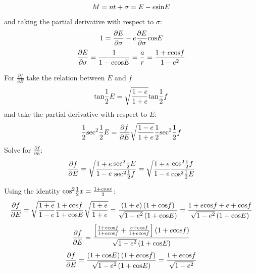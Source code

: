 \documentclass[]{aiaa-tc}%
\begin{document}
	\begin{equation}
		M=nt+\sigma=E-e\textup{sin}E 
	\end{equation}
and taking the partial derivative with respect to $\sigma$:
	\begin{equation}
		1=\frac{\partial E}{\partial \sigma}-e\frac{\partial E}{\partial \sigma}\textup{cos}E 
	\end{equation}
	\begin{equation}
		\frac{\partial E}{\partial \sigma}=\frac{1}{1-e\textup{cos}E}=\frac{a}{r}=\frac{1+e\textup{cos}f}{1-e^2}
		\label{eqn:partialESig}
	\end{equation}

For $\frac{\partial f}{\partial E}$ take the relation between $E$ and $f$ 
	\begin{equation}
		\textup{tan}\frac{1}{2}E=\sqrt{\frac{1-e}{1+e}}\textup{tan}\frac{1}{2}f
	\end{equation}
and take the partial derivative with respect to $E$:
	\begin{equation}
		\frac{1}{2}\textup{sec}^2\frac{1}{2}E=\frac{\partial f}{\partial E}\sqrt{\frac{1-e}{1+e}}\frac{1}{2}\textup{sec}^2\frac{1}{2}f
	\end{equation}
Solve for $\frac{\partial f}{\partial E}$:
	\begin{equation}
		\frac{\partial f}{\partial E} = \sqrt{\frac{1+e}{1-e}}\frac{\textup{sec}^2\frac{1}{2}E}{\textup{sec}^2\frac{1}{2}f}= \sqrt{\frac{1+e}{1-e}}\frac{\textup{cos}^2\frac{1}{2}f}{\textup{cos}^2\frac{1}{2}E}
	\end{equation}

Using the identity $\textup{cos}^2\frac{1}{2}x=\frac{1+{cos}x}{2}$:
	\begin{equation}
		\frac{\partial f}{\partial E} = \sqrt{\frac{1+e}{1-e}}\frac{1+\textup{cos}f}{1+\textup{cos}E}\sqrt{\frac{1+e}{1+e}}=\frac{\left ( 1+e \right )\left (1+\textup{cos}f  \right )}{\sqrt{1-e^2}\left (1+\textup{cos}E  \right )}=\frac{1+e\textup{cos}f+e+\textup{cos}f}{\sqrt{1-e^2}\left (1+\textup{cos}E  \right )}
	\end{equation}
	\begin{equation}
		\frac{\partial f}{\partial E} =\frac{ \left [\frac{1+e\textup{cos}f}{1+e\textup{cos}f}+\frac{e+\textup{cos}f }{1+e\textup{cos}f}  \right ]\left (1+e\textup{cos}f  \right )}{\sqrt{1-e^2}\left (1+\textup{cos}E  \right )}
	\end{equation}
	\begin{equation}
		\frac{\partial f}{\partial E} =\frac{ \left (1+\textup{cos}E  \right )\left (1+e\textup{cos}f  \right )}{\sqrt{1-e^2}\left (1+\textup{cos}E  \right )}=\frac{ 1+e\textup{cos}f }{\sqrt{1-e^2}}
		\label{eqn:partialfE}
	\end{equation}
\end{document}
